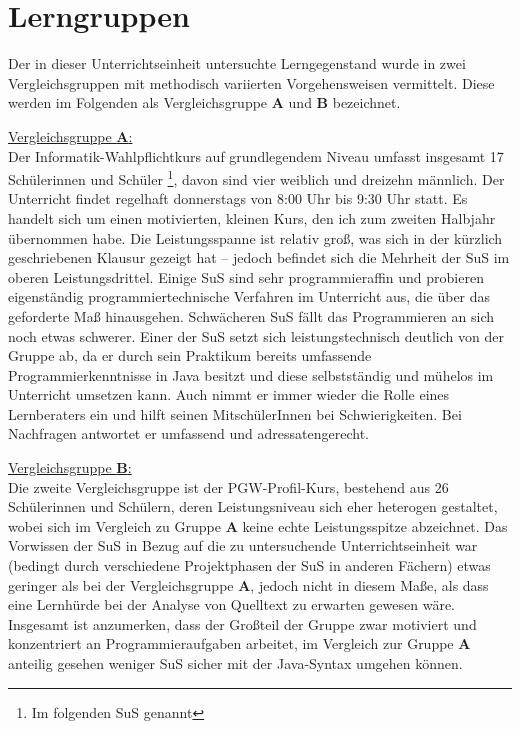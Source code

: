 \documentclass[paper=a4, DIV=13, BCOR=12mm, twoside=on, onecolumn=on, open = any, titlepage =on, parskip =half-, headsepline = on, footsepline = on, chapterprefix = on, sectionprefix = on, appendixprefix = off, fontsize = 11pt, numbers = noenddot, abstract = off]{scrreprt}
\begin{document}
\par \singlespacing
 \section{Lerngruppen}
\onehalfspacing
Der in dieser Unterrichtseinheit untersuchte Lerngegenstand wurde in zwei Vergleichsgruppen mit methodisch variierten Vorgehensweisen vermittelt. Diese werden im Folgenden als Vergleichsgruppe \textsc{\textbf{A}} und \textsc{\textbf{B}} bezeichnet.


\underline{Vergleichsgruppe \textsc{\textbf{A}}:}\\
Der Informatik-Wahlpflichtkurs auf grundlegendem Niveau umfasst insgesamt 17 Schülerinnen und Schüler \footnote[1]{Im folgenden SuS genannt}, davon sind vier weiblich und dreizehn männlich. Der Unterricht findet regelhaft donnerstags von 8:00 Uhr bis 9:30 Uhr statt. 
Es handelt sich um einen motivierten, kleinen Kurs, den ich zum zweiten Halbjahr übernommen habe. Die Leistungsspanne ist relativ groß, was sich in der kürzlich geschriebenen Klausur gezeigt hat – jedoch befindet sich die Mehrheit der SuS im oberen Leistungsdrittel. Einige SuS sind sehr programmieraffin und probieren eigenständig programmiertechnische Verfahren im Unterricht aus, die über das geforderte Maß hinausgehen. Schwächeren SuS fällt das Programmieren an sich noch etwas schwerer. Einer der SuS setzt sich leistungstechnisch deutlich von der Gruppe ab, da er durch sein Praktikum bereits umfassende Programmierkenntnisse in Java besitzt und diese selbstständig und mühelos im Unterricht umsetzen kann. Auch nimmt er immer wieder die Rolle eines Lernberaters ein und hilft seinen MitschülerInnen bei Schwierigkeiten. Bei Nachfragen antwortet er umfassend und adressatengerecht.

\underline{Vergleichsgruppe \textsc{\textbf{B}}:}\\
Die zweite Vergleichsgruppe ist der PGW-Profil-Kurs, bestehend aus 26 Schülerinnen und Schülern, deren Leistungsniveau sich eher heterogen gestaltet, wobei sich im Vergleich zu Gruppe \textsc{\textbf{A}} keine echte Leistungsspitze abzeichnet. Das Vorwissen der SuS in Bezug auf die zu untersuchende Unterrichtseinheit war (bedingt durch verschiedene Projektphasen der SuS in anderen Fächern) etwas geringer als bei der Vergleichsgruppe \textsc{\textbf{A}}, jedoch nicht in diesem Maße, als dass eine Lernhürde bei der Analyse von Quelltext zu erwarten gewesen wäre. Insgesamt ist anzumerken, dass der Großteil der Gruppe zwar motiviert und konzentriert an Programmieraufgaben arbeitet, im Vergleich zur Gruppe \textsc{\textbf{A}} anteilig gesehen weniger SuS sicher mit der Java-Syntax umgehen können. 
\end{document}
